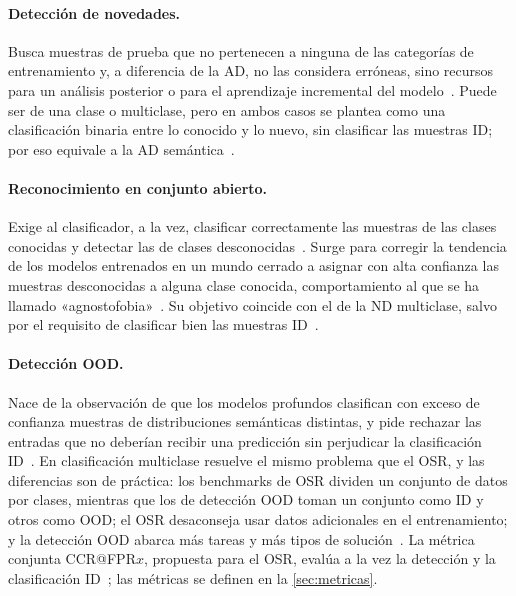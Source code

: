 \paragraph{Detección de novedades.} Busca muestras de prueba que no pertenecen a
ninguna de las categorías de entrenamiento y, a diferencia de la AD, no las
considera erróneas, sino recursos para un análisis posterior o para el
aprendizaje incremental del modelo~\cite{yang2024}. Puede ser de una clase o
multiclase, pero en ambos casos se plantea como una clasificación binaria entre
lo conocido y lo nuevo, sin clasificar las muestras ID; por eso equivale a la AD
semántica~\cite{yang2024}.

\paragraph{Reconocimiento en conjunto abierto.} Exige al clasificador, a la vez,
clasificar correctamente las muestras de las clases conocidas y detectar las de
clases desconocidas~\cite{yang2024}. Surge para corregir la tendencia de los
modelos entrenados en un mundo cerrado a asignar con alta confianza las muestras
desconocidas a alguna clase conocida, comportamiento al que se ha llamado
«agnostofobia»~\cite{yang2024,dhamija2018}. Su objetivo coincide con el de la ND
multiclase, salvo por el requisito de clasificar bien las muestras
ID~\cite{yang2024}.

\paragraph{Detección OOD.} Nace de la observación de que los modelos profundos
clasifican con exceso de confianza muestras de distribuciones semánticas
distintas, y pide rechazar las entradas que no deberían recibir una predicción
sin perjudicar la clasificación ID~\cite{yang2024,hendrycks2017}. En
clasificación multiclase resuelve el mismo problema que el OSR, y las diferencias
son de práctica: los benchmarks de OSR dividen un conjunto de datos por clases,
mientras que los de detección OOD toman un conjunto como ID y otros como OOD; el
OSR desaconseja usar datos adicionales en el entrenamiento; y la detección OOD
abarca más tareas y más tipos de solución~\cite{yang2024}. La métrica conjunta
CCR@FPR$x$, propuesta para el OSR, evalúa a la vez la detección y la
clasificación ID~\cite{yang2024,dhamija2018}; las métricas se definen en la
\cref{sec:metricas}.

